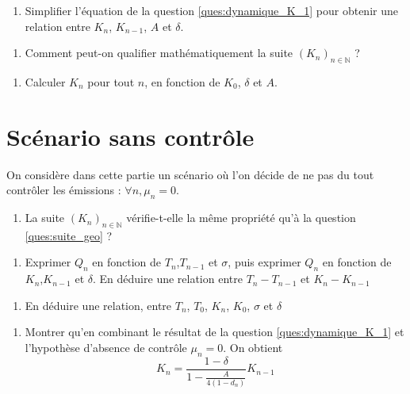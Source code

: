 \documentclass[12pt]{article}
\newcommand{\ques}[1]{\begin{enumerate}[resume]
\item  #1
\end{enumerate}}
\newcommand{\rep}[1]{\textit{Réponse :} #1 \\}
\renewcommand{\rep}[1]{ }
\theoremstyle{remark}
\def\NN{\mathbb{N}}
\begin{document}
\ques{Simplifier l'équation de la question \ref{ques:dynamique_K_1} pour obtenir une relation entre $K_n$, $K_{n-1}$, $A$ et $\delta$.\label{ques:dynamique_K_2} }
\rep{
\begin{equation*}
\forall n, \quad \Omega_n = \frac{1-0,05}{1+0,0133 (\frac{T_0}{3})}^2=\frac{0,95}{1,000945778}=0,9491
\end{equation*}
\begin{equation*}
\forall n, \quad  K_n = \frac{1- \delta}{1- 0,2373 A} K_{n-1}
\end{equation*}
}

\ques{Comment peut-on qualifier mathématiquement la suite $(K_n)_{n\in \NN}$ ? \label{ques:suite_geo}}
\rep{$(K_n)_{n\in \NN}$ est une suite géométrique de raison $\frac{1- \delta}{1- 0,2373 A}$.}

\ques{Calculer $K_n$ pour tout $n$, en fonction de $K_0$, $\delta$ et $A$.}
\rep{\begin{equation*}
\forall n, \quad  K_n = K_0 \big(\frac{1- \delta}{1- 0,2373 A}\big)^n 
\end{equation*}}

\section{Scénario sans contrôle}
On considère dans cette partie un scénario où l'on décide de ne pas du tout contrôler les émissions : $\forall n, \mu_n=0$.
\ques{La suite $(K_n)_{n\in \NN}$ vérifie-t-elle la même propriété qu'à la question \ref{ques:suite_geo} ?}
\rep{Non, dans ce cas la suite $(T_n)_{n\in \NN}$, et donc la suite $(\Omega_n)_{n\in \NN}$, n'est pas constante et dépend de $(K_n)_{n\in \NN}$. La suite $(K_n)_{n\in \NN}$ n'est donc pas géométrique.}

\ques{Exprimer $Q_n$ en fonction de $T_n$,$T_{n-1}$ et $\sigma$, puis exprimer $Q_n$ en fonction de $K_n$,$K_{n-1}$ et $\delta$. En déduire une relation entre $T_n-T_{n-1}$ et $K_n - K_{n-1}$}
\rep{$Q_n = 2000 \sigma (T_n -T_{n-1}) = 4 (1- \delta) (K_n -K_{n-1})$}

\ques{En déduire une relation, entre $T_n$, $T_0$, $K_n$, $K_0$, $\sigma$ et $\delta$}
\rep{En télescopant, on obtient \begin{equation*}  T_n -T_0 = \frac{4(1-\delta)}{2000\sigma} (K_n -K_0)\end{equation*}}

\ques{Montrer qu'en combinant le résultat de la question \ref{ques:dynamique_K_1} et l'hypothèse d'absence de contrôle $\mu_n =0$. On obtient
\begin{equation*} 
K_n=\frac{1- \delta}{1- \frac{A}{4(1-d_n)}} K_{n-1}\end{equation*}
\label{ques:dynamique_K_3}
}
\end{document}
